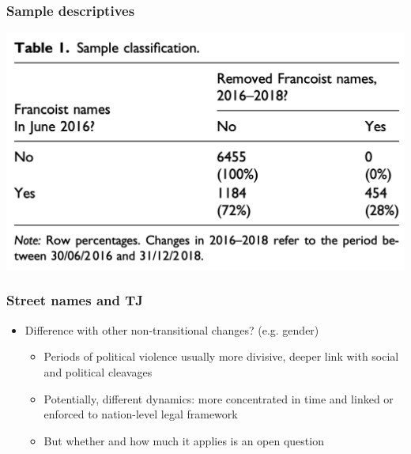\documentclass[aspectratio=43]{beamer}
\begin{document}
\begin{frame}
\frametitle{Sample descriptives}
\centering

\includegraphics[width = \textwidth]{img/table_sample}

\end{frame}



\begin{frame}
\frametitle{Street names and TJ}
\centering

\begin{itemize}
  \item Difference with other non-transitional changes? (e.g. gender)
  \begin{itemize}
    \item Periods of political violence usually more divisive, deeper link with social and political cleavages
    \item Potentially, different dynamics: more concentrated in time and linked or enforced to nation-level legal framework
    \item But whether and how much it applies is an open question
  \end{itemize}
\end{itemize}

\end{frame}

\end{document}

